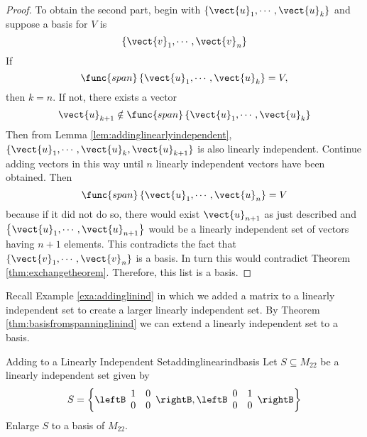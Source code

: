 \begin{proof}
To obtain the second part, begin with $\{\vect{u}_{1},\cdots ,\vect{u}
_{k}\}$ and suppose a basis for $V$ is 
\begin{equation*}
\left\{ \vect{v}_{1},\cdots ,\vect{v}_{n}\right\} 
\end{equation*}
If 
\begin{equation*}
\func{span}\left\{ \vect{u}_{1},\cdots ,\vect{u}_{k}\right\} =V,
\end{equation*}
then $k=n$. If not, there exists a vector 
\begin{equation*}
\vect{u}_{k+1}\notin \func{span}\left\{ \vect{u}_{1},\cdots ,\vect{u}
_{k}\right\}
\end{equation*}
Then from Lemma \ref{lem:addinglinearlyindependent}, $\{\vect{u}_{1},\cdots ,\vect{u}_{k},
\vect{u}_{k+1}\}$ is also linearly independent. Continue adding vectors in
this way until $n$ linearly independent vectors have been obtained. Then 
\begin{equation*}
\func{span}\left\{ \vect{u}_{1},\cdots ,\vect{u}_{n}\right\} =V
\end{equation*}
because if it did not do so, there would exist $\vect{u}_{n+1}$ as just
described and $\left\{ \vect{u}_{1},\cdots ,\vect{u}_{n+1}\right\} $
would be a linearly independent set of vectors having $n+1$ elements. This contradicts the fact that $\left\{ \vect{v}_{1},\cdots ,\vect{v}_{n}\right\} $ is a basis.
 In turn this would contradict Theorem \ref{thm:exchangetheorem}. Therefore, this list is a
basis. 
\end{proof}

Recall Example \ref{exa:addinglinind} in which we added a matrix to a linearly independent set to create a larger linearly independent set. By Theorem \ref{thm:basisfromspanninglinind} we can extend a linearly independent set to a basis.  

\begin{example}{Adding to a Linearly Independent Set}{addinglinearindbasis}
Let $S \subseteq M_{22}$ be a linearly independent set given by 
\[
S  = \left\{ \leftB \begin{array}{rr}
1 & 0 \\
0 & 0 
\end{array} \rightB, \leftB \begin{array}{rr}
0 & 1 \\
0 & 0 
\end{array} \rightB \right\}
\]
Enlarge $S$ to a basis of $M_{22}$. 
\end{example}

